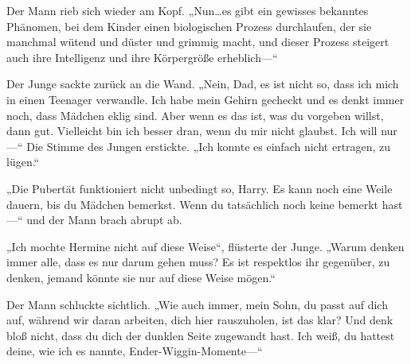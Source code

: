 Der Mann rieb sich wieder am Kopf. „Nun…es gibt ein gewisses bekanntes Phänomen, bei dem Kinder einen biologischen Prozess durchlaufen, der sie manchmal wütend und düster und grimmig macht, und dieser Prozess steigert auch ihre Intelligenz und ihre Körpergröße erheblich—“

Der Junge sackte zurück an die Wand. „Nein, Dad, es ist nicht so, dass ich mich in einen Teenager verwandle. Ich habe mein Gehirn gecheckt und es denkt immer noch, dass Mädchen eklig sind. Aber wenn es das ist, was du vorgeben willst, dann gut. Vielleicht bin ich besser dran, wenn du mir nicht glaubst. Ich will nur—“ Die Stimme des Jungen erstickte. „Ich konnte es einfach nicht ertragen, zu lügen.“

„Die Pubertät funktioniert nicht unbedingt so, Harry. Es kann noch eine Weile dauern, bis du Mädchen bemerkst. Wenn du tatsächlich noch keine bemerkt hast—“ und der Mann brach abrupt ab.

„Ich mochte Hermine nicht auf diese Weise“, flüsterte der Junge. „Warum denken immer alle, dass es nur darum gehen muss? Es ist respektlos ihr gegenüber, zu denken, jemand könnte sie nur auf diese Weise mögen.“

Der Mann schluckte sichtlich. „Wie auch immer, mein Sohn, du passt auf dich auf, während wir daran arbeiten, dich hier rauszuholen, ist das klar? Und denk bloß nicht, dass du dich der dunklen Seite zugewandt hast. Ich weiß, du hattest deine, wie ich es nannte, Ender-Wiggin-Momente—“

